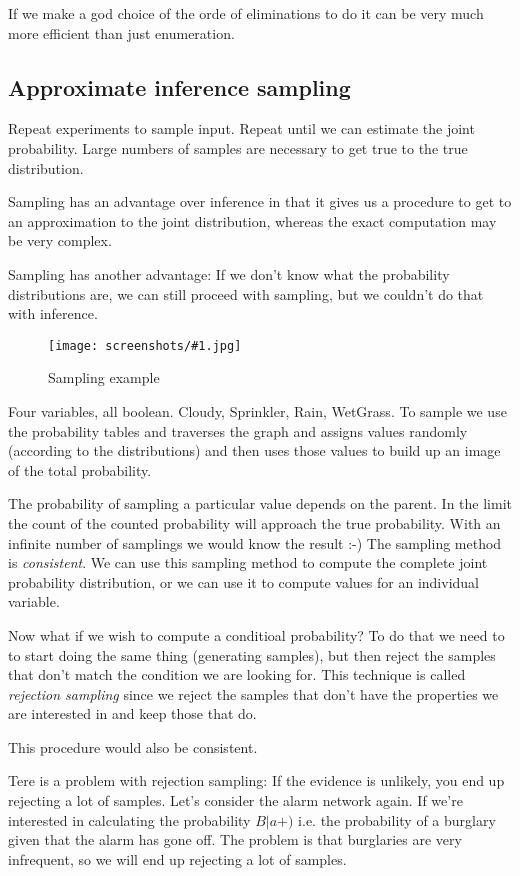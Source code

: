 \documentclass[a4, 12pt, english, USenglish]{scrreprt}
\newcommand{\screenshot}[2]{
\begin{figure}[htb]
\texttt{[image: screenshots/\#1.jpg]}
\label{#1}
\caption{#2}
\end{figure}}
\newcommand{\idx}[1]{{\em #1}\index{#1}}
\begin{document}
If we make a god choice of the orde of eliminations to do it can be
very much more efficient than just enumeration.

\subsection{Approximate inference sampling}

Repeat experiments to sample input.   Repeat until we can estimate the
joint probability.  Large numbers of samples are necessary to get true
to the true distribution.

Sampling has an advantage over inference in that it gives us a
procedure to get to an approximation to the joint distribution,
whereas the exact computation may be very complex.

Sampling has another advantage: If we don't know what the probability
distributions are, we can still proceed with sampling, but we couldn't
do that with inference.


\screenshot{samplingexample}{Sampling example}


Four variables, all boolean. Cloudy, Sprinkler, Rain, WetGrass.   To
sample we use the probability tables and traverses the graph and
assigns values randomly (according to the distributions) and then uses
those values to build up an image of the total probability.

The probability of sampling a particular value depends on the parent.
In the limit the count of the counted probability will approach the
true probability.  With an infinite number of samplings we would know
the result :-)  The sampling method is \idx{consistent}.  We can use
this sampling method to compute the complete joint probability
distribution, or we can use it to compute values for an individual
variable.


Now what if we wish to compute a conditioal probability?    To do that
we need to to start doing the same thing (generating samples), but
then reject the samples that don't match the condition we are looking
for.  This technique is called \idx{rejection sampling} since we
reject the samples that don't have the properties we are interested in
and keep those that do.

This procedure would also be consistent.

Tere is a problem with rejection sampling: If the evidence is
unlikely, you end up  rejecting a lot of samples.  Let's consider the
alarm network again.  If we're interested in calculating the
probability \(B|a+)\) i.e. the probability of a burglary given that
the alarm has gone off.  The problem is that burglaries are very
infrequent, so we will end up rejecting a lot of samples.
\end{document}
